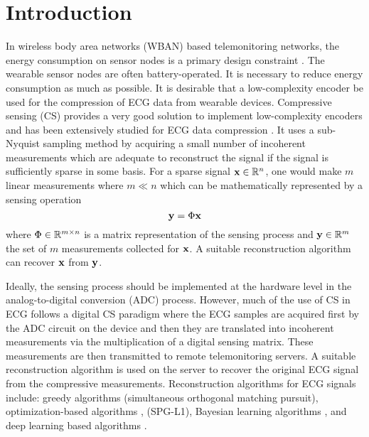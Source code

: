 \section{Introduction}
\label{sec:intro}
In wireless body area networks (WBAN)
based telemonitoring networks\cite{cao2009enabling},
the energy consumption on sensor nodes is
a primary design constraint \cite{milenkovic2006wireless}.
The wearable sensor nodes are often battery-operated.
It is necessary to reduce energy consumption as
much as possible.
It is desirable that a low-complexity encoder
be used for the compression of ECG data from wearable
devices.
Compressive sensing (CS) \cite{donoho2006compressed,baraniuk2007compressive,
candes2006compressive, candes2008introduction, candes2006near}
provides a very good solution to implement low-complexity encoders
and has been extensively studied for ECG data
compression \cite{craven2014compressed,kumar2022review}.
It uses a sub-Nyquist sampling method by acquiring a small number
of incoherent measurements which are adequate to reconstruct
the signal if the signal is sufficiently sparse in some
basis.
For a sparse signal $\mathbf{x} \in \mathbb{R}^n$, one would make
$m$ linear measurements where $m \ll n$ which can be
mathematically represented by a sensing operation
\begin{equation}
\mathbf{y} = \Phi \mathbf{x}
\end{equation}
where $\Phi \in \mathbb{R}^{m \times n}$ is a matrix
representation of the sensing process and $\mathbf{y} \in \mathbb{R}^m$
the set of $m$ measurements collected for $\mathbf{x}$.
A suitable reconstruction algorithm can recover $\mathbf{x}$
from $\mathbf{y}$.

Ideally, the sensing process should be implemented at the
hardware level in the analog-to-digital conversion (ADC) process.
However, much of the use of CS in ECG follows
a digital CS paradigm \cite{mamaghanian2011compressed} where
the ECG samples are acquired first by the ADC circuit on the
device and then they are translated into incoherent
measurements via the multiplication of a digital sensing matrix.
These measurements are then transmitted
to remote telemonitoring servers.
A suitable reconstruction algorithm is used on the server
to recover the original ECG signal from the compressive measurements.
Reconstruction algorithms for ECG signals include:
greedy algorithms 
\cite{polania2011compressed} (simultaneous orthogonal matching pursuit),
optimization-based algorithms \cite{zhang2014energy},
\cite{mamaghanian2011compressed} (SPG-L1),
Bayesian learning algorithms
\cite{zhang2012compressed,zhang2014spatiotemporal,zhang2013extension},
and deep learning based algorithms \cite{zhang2021csnet}.

